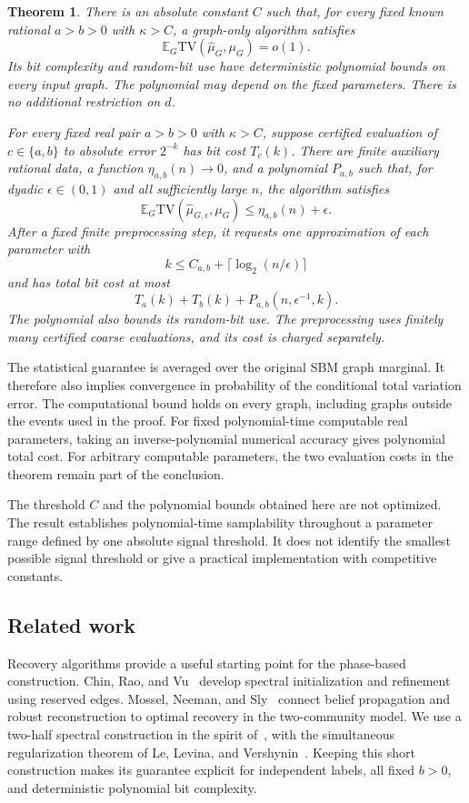 \documentclass[11pt]{article}
\newcommand{\TV}{\mathrm{TV}}
\def\E{\mathbb{E}}
\newtheorem{thm}{Theorem}[section]
\numberwithin{equation}{section}
\begin{document}
\begin{thm}\label{thm:main}
There is an absolute constant $C$ such that, for every fixed known rational $a>b>0$ with $\kappa>C$, a graph-only algorithm satisfies
\[
 \E_G\TV(\widehat\mu_G,\mu_G)=o(1).
\]
Its bit complexity and random-bit use have deterministic polynomial bounds on every input graph. The polynomial may depend on the fixed parameters. There is no additional restriction on $d$.

For every fixed real pair $a>b>0$ with $\kappa>C$, suppose certified evaluation of $c\in\{a,b\}$ to absolute error $2^{-k}$ has bit cost $T_c(k)$. There are finite auxiliary rational data, a function $\eta_{a,b}(n)\to0$, and a polynomial $P_{a,b}$ such that, for dyadic $\epsilon\in(0,1)$ and all sufficiently large $n$, the algorithm satisfies
\[
 \E_G\TV(\widehat\mu_{G,\epsilon},\mu_G)\le\eta_{a,b}(n)+\epsilon.
\]
After a fixed finite preprocessing step, it requests one approximation of each parameter with
\[
 k\le C_{a,b}+\lceil\log_2(n/\epsilon)\rceil
\]
and has total bit cost at most
\[
 T_a(k)+T_b(k)+P_{a,b}(n,\epsilon^{-1},k).
\]
The polynomial also bounds its random-bit use. The preprocessing uses finitely many certified coarse evaluations, and its cost is charged separately.
\end{thm}

The statistical guarantee is averaged over the original SBM graph marginal. It therefore also implies convergence in probability of the conditional total variation error. The computational bound holds on every graph, including graphs outside the events used in the proof. For fixed polynomial-time computable real parameters, taking an inverse-polynomial numerical accuracy gives polynomial total cost. For arbitrary computable parameters, the two evaluation costs in the theorem remain part of the conclusion.

The threshold $C$ and the polynomial bounds obtained here are not optimized. The result establishes polynomial-time samplability throughout a parameter range defined by one absolute signal threshold. It does not identify the smallest possible signal threshold or give a practical implementation with competitive constants.

\subsection{Related work}

Recovery algorithms provide a useful starting point for the phase-based construction. Chin, Rao, and Vu~\cite{CRV15} develop spectral initialization and refinement using reserved edges. Mossel, Neeman, and Sly~\cite{MNS16} connect belief propagation and robust reconstruction to optimal recovery in the two-community model. We use a two-half spectral construction in the spirit of~\cite{CRV15}, with the simultaneous regularization theorem of Le, Levina, and Vershynin~\cite{LLV17}. Keeping this short construction makes its guarantee explicit for independent labels, all fixed $b>0$, and deterministic polynomial bit complexity.
\end{document}
